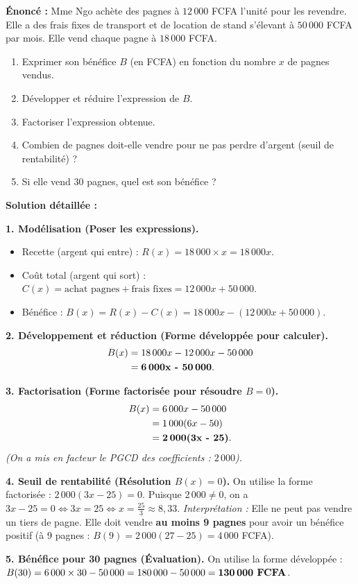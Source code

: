 \documentclass[11pt]{article}
\begin{document}
\begin{exoresolu}
\textbf{Énoncé :} Mme Ngo achète des pagnes à $12\,000$ FCFA l'unité pour les revendre. Elle a des frais fixes de transport et de location de stand s'élevant à $50\,000$ FCFA par mois. Elle vend chaque pagne à $18\,000$ FCFA.
\begin{enumerate}
    \item Exprimer son bénéfice $B$ (en FCFA) en fonction du nombre $x$ de pagnes vendus.
    \item Développer et réduire l'expression de $B$.
    \item Factoriser l'expression obtenue.
    \item Combien de pagnes doit-elle vendre pour ne pas perdre d'argent (seuil de rentabilité) ?
    \item Si elle vend $30$ pagnes, quel est son bénéfice ?
\end{enumerate}
\tcblower
\textbf{Solution détaillée :}

\noindent \textbf{1. Modélisation (Poser les expressions).}
\begin{itemize}
    \item Recette (argent qui entre) : $R(x) = 18\,000 \times x = 18\,000x$.
    \item Coût total (argent qui sort) : $C(x) = \text{achat pagnes} + \text{frais fixes} = 12\,000x + 50\,000$.
    \item Bénéfice : $B(x) = R(x) - C(x) = 18\,000x - (12\,000x + 50\,000)$.
\end{itemize}

\noindent \textbf{2. Développement et réduction (Forme développée pour calculer).}
\begin{align*}
B(x) &= 18\,000x - 12\,000x - 50\,000 \\
     &= \textbf{6\,000x - 50\,000}.
\end{align*}

\noindent \textbf{3. Factorisation (Forme factorisée pour résoudre $B=0$).}
\begin{align*}
B(x) &= 6\,000x - 50\,000 \\
     &= 1\,000(6x - 50) \\
     &= \textbf{2\,000(3x - 25)}.
\end{align*}
\emph{(On a mis en facteur le PGCD des coefficients : $2\,000$).}

\noindent \textbf{4. Seuil de rentabilité (Résolution $B(x) = 0$).}
On utilise la forme factorisée : $2\,000(3x - 25) = 0$.
Puisque $2\,000 \neq 0$, on a $3x - 25 = 0 \iff 3x = 25 \iff x = \frac{25}{3} \approx 8,33$.
\emph{Interprétation :} Elle ne peut pas vendre un tiers de pagne. Elle doit vendre \textbf{au moins 9 pagnes} pour avoir un bénéfice positif (à 9 pagnes : $B(9) = 2\,000(27-25) = 4\,000$ FCFA).

\noindent \textbf{5. Bénéfice pour 30 pagnes (Évaluation).}
On utilise la forme développée : $B(30) = 6\,000 \times 30 - 50\,000 = 180\,000 - 50\,000 = \textbf{130\,000 FCFA}$.
\end{exoresolu}
\end{document}
